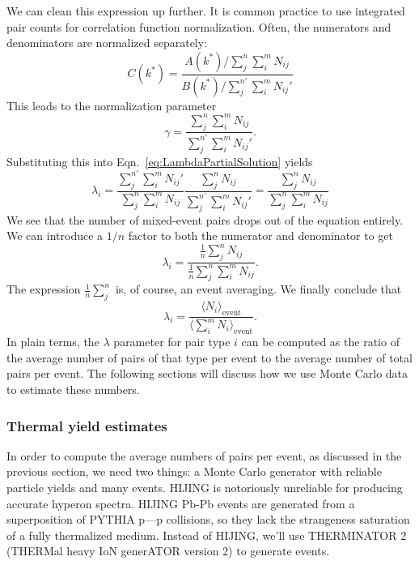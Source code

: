 We can clean this expression up further.  It is common practice to use integrated pair counts for correlation function normalization. Often, the numerators and denominators are normalized separately:
\begin{equation}
C(k^*) = \frac{A(k^*)/\sum_j^n \sum_i^m N_{ij}}{B(k^*)/\sum_j^{n'} \sum_i^m N_{ij}'}
\end{equation}
This leads to the normalization parameter
\begin{equation}
\gamma = \frac{\sum_j^n \sum_i^m N_{ij}}{\sum_j^{n'} \sum_i^m N_{ij}'}.
\end{equation}
Substituting this into Eqn.\ \ref{eq:LambdaPartialSolution} yields 
\begin{equation}
\lambda_i = \frac{\sum_j^{n'} \sum_i^m N_{ij}'} {\sum_j^n \sum_i^m N_{ij}} \frac{\sum_j^n N_{ij} }{\sum_j^{n'} \sum_i^m N_{ij}'} = \frac{\sum_j^n N_{ij} }{\sum_j^n \sum_i^m N_{ij}}
\end{equation}
We see that the number of mixed-event pairs drops out of the equation entirely. We can introduce a $1/n$ factor to both the numerator and denominator to get
\begin{equation}
\lambda_i = \frac{\frac{1}{n}\sum_j^n N_{ij} }{\frac{1}{n}\sum_j^n \sum_i^m N_{ij}}.
\end{equation}
The expression $\frac{1}{n} \sum_j^n$ is, of course, an event averaging. We finally conclude that
\begin{equation}
\label{eq:LambdaParSolution}
\lambda_i = \frac{\langle N_{i}\rangle_{\mathrm{event}}} {\langle\sum_i^m N_{i}\rangle_{\mathrm{event}}}.
\end{equation}
In plain terms, the $\lambda$ parameter for pair type $i$ can be computed as the ratio of the average number of pairs of that type per event to the average number of total pairs per event. 
The following sections will discuss how we use Monte Carlo data to estimate these numbers.

\subsubsection{Thermal yield estimates}
\label{sec:ThermalYields}


In order to compute the average numbers of pairs per event, as discussed in the previous section, we need two things: a Monte Carlo generator with reliable particle yields and many events. 
HIJING is notoriously unreliable for producing accurate hyperon spectra.  
HIJING Pb-Pb events are generated from a superposition of PYTHIA p---p collisions, so they lack the strangeness saturation of a fully thermalized medium.  
Instead of HIJING, we'll use THERMINATOR 2 (THERMal heavy IoN generATOR version 2)  \cite{Chojnacki:2011hb} to generate events.

